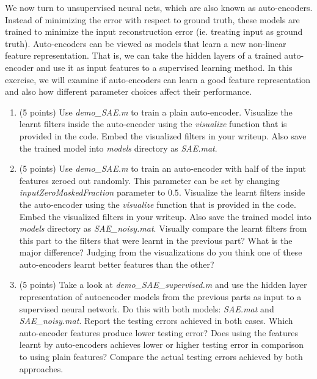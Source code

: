 \documentclass[english]{article}
\begin{document}
We now turn to unsupervised neural nets, which are also known as auto-encoders. Instead of minimizing the error with respect to ground truth, these models are trained to minimize the input reconstruction error (ie. treating input as ground truth). Auto-encoders can be viewed as models that learn a new non-linear feature representation. That is, we can take the hidden layers of a trained auto-encoder and use it as input features to a supervised learning method. In this exercise, we will examine if auto-encoders can learn a good feature representation and also how different parameter choices affect their performance.

\begin{enumerate}
\item (5 points) Use \textit{demo\_SAE.m} to train a plain auto-encoder. Visualize the learnt filters inside the auto-encoder using the \textit{visualize} function that is provided in the code. Embed the visualized filters in your writeup. Also save the trained model into \textit{models} directory as \textit{SAE.mat}.

\item (5 points) Use \textit{demo\_SAE.m} to train an auto-encoder with half of the input features zeroed out randomly. This parameter can be set by changing \textit{inputZeroMaskedFraction} parameter to $0.5$. Visualize the learnt filters inside the auto-encoder using the \textit{visualize} function that is provided in the code. Embed the visualized filters in your writeup. Also save the trained model into \textit{models} directory as \textit{SAE\_noisy.mat}. Visually compare the learnt filters from this part to the filters that were learnt in the previous part? What is the major difference? Judging from the visualizations do you think one of these auto-encoders learnt better features than the other?


\item (5 points) Take a look at \textit{demo\_SAE\_supervised.m} and use the hidden layer representation of autoencoder models from the previous parts as input to a supervised neural network. Do this with both models: \textit{SAE.mat} and \textit{SAE\_noisy.mat}. Report the testing errors achieved in both cases. Which auto-encoder features produce lower testing error? Does using the features learnt by auto-encoders achieves lower or higher testing error in comparison to using plain features? Compare the actual testing errors achieved by both approaches.

\end{enumerate}
\end{document}
